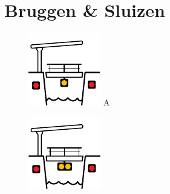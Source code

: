 \chapter{Bruggen \& Sluizen}
\vspace{-120px}


\begin{figure}[H]
	\centering
	\begin{minipage}[b]{0.23\textwidth}
		\includegraphics[width=\textwidth]{Hoofdstukken/Bruggen/pdf/brug_doorvaart_toegestaan.pdf}
		\centering
		A
	\end{minipage}
	\hfill
	\begin{minipage}[b]{0.23\textwidth}
		\includegraphics[width=\textwidth]{Hoofdstukken/Bruggen/pdf/brug_doorvaart_geen_tegenligger.pdf}

\end{minipage}
\end{figure}
